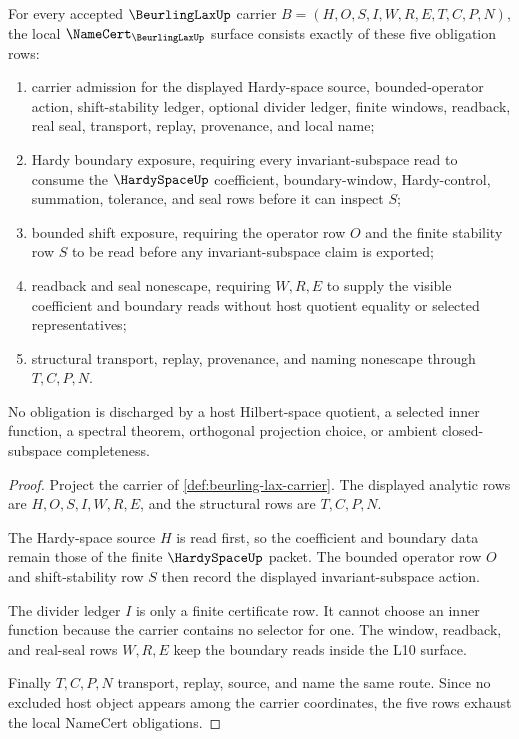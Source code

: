 \begin{theorem}
\label{thm:beurling-lax-namecert-obligations}
For every accepted $\BeurlingLaxUp$ carrier $B=(H,O,S,I,W,R,E,T,C,P,N)$, the local $\NameCert_{\BeurlingLaxUp}$ surface consists exactly of these five obligation rows:
\begin{enumerate}
\item carrier admission for the displayed Hardy-space source, bounded-operator action, shift-stability ledger, optional divider ledger, finite windows, readback, real seal, transport, replay, provenance, and local name;
\item Hardy boundary exposure, requiring every invariant-subspace read to consume the $\HardySpaceUp$ coefficient, boundary-window, Hardy-control, summation, tolerance, and seal rows before it can inspect $S$;
\item bounded shift exposure, requiring the operator row $O$ and the finite stability row $S$ to be read before any invariant-subspace claim is exported;
\item readback and seal nonescape, requiring $W,R,E$ to supply the visible coefficient and boundary reads without host quotient equality or selected representatives;
\item structural transport, replay, provenance, and naming nonescape through $T,C,P,N$.
\end{enumerate}
No obligation is discharged by a host Hilbert-space quotient, a selected inner function, a spectral theorem, orthogonal projection choice, or ambient closed-subspace completeness.
\end{theorem}
\begin{proof}
Project the carrier of \autoref{def:beurling-lax-carrier}. The displayed analytic rows are $H,O,S,I,W,R,E$, and the structural rows are $T,C,P,N$.

The Hardy-space source $H$ is read first, so the coefficient and boundary data remain those of the finite $\HardySpaceUp$ packet. The bounded operator row $O$ and shift-stability row $S$ then record the displayed invariant-subspace action.

The divider ledger $I$ is only a finite certificate row. It cannot choose an inner function because the carrier contains no selector for one. The window, readback, and real-seal rows $W,R,E$ keep the boundary reads inside the L10 surface.

Finally $T,C,P,N$ transport, replay, source, and name the same route. Since no excluded host object appears among the carrier coordinates, the five rows exhaust the local NameCert obligations.
\end{proof}

